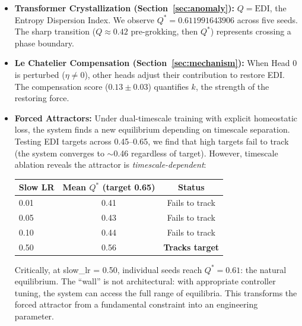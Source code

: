 \begin{itemize}
    \item \textbf{Transformer Crystallization (Section~\ref{sec:anomaly}):} $Q = \text{EDI}$, the Entropy Dispersion Index. We observe $Q^* = 0.611991643906$ across five seeds. The sharp transition ($Q \approx 0.42$ pre-grokking, then $Q^*$) represents crossing a phase boundary.
    
    \item \textbf{Le Chatelier Compensation (Section~\ref{sec:mechanism}):} When Head 0 is perturbed ($\eta \neq 0$), other heads adjust their contribution to restore EDI. The compensation score ($0.13 \pm 0.03$) quantifies $k$, the strength of the restoring force.
    
    \item \textbf{Forced Attractors:} Under dual-timescale training with explicit homeostatic loss, the system finds a new equilibrium depending on timescale separation. Testing EDI targets across 0.45–0.65, we find that high targets fail to track (the system converges to $\sim$0.46 regardless of target). However, timescale ablation reveals the attractor is \textit{timescale-dependent}:
    
    \begin{center}
    \begin{tabular}{lcc}
    \toprule
    Slow LR & Mean $Q^*$ (target 0.65) & Status \\
    \midrule
    0.01 & 0.41 & Fails to track \\
    0.05 & 0.43 & Fails to track \\
    0.10 & 0.44 & Fails to track \\
    0.50 & 0.56 & \textbf{Tracks target} \\
    \bottomrule
    \end{tabular}
    \end{center}
    
    \noindent Critically, at slow\_lr = 0.50, individual seeds reach $Q^* = 0.61$: the natural equilibrium. The ``wall'' is not architectural: with appropriate controller tuning, the system can access the full range of equilibria. This transforms the forced attractor from a fundamental constraint into an engineering parameter.
\end{itemize}

